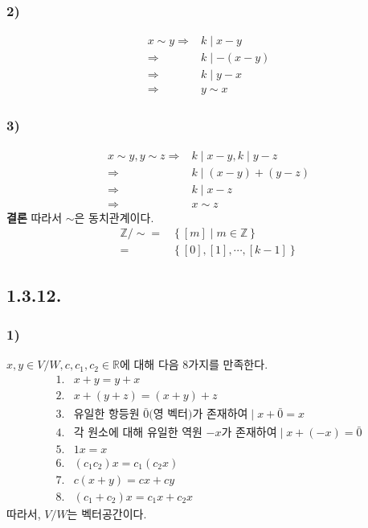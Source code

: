 \documentclass{article}
\begin{document}
\subsubsection{2)}
\begin{align*}
x \sim y \Rightarrow& k \mid x - y
\\ \Rightarrow& k \mid -(x - y)
\\ \Rightarrow& k \mid y - x
\\ \Rightarrow& y \sim x
\end{align*}

\subsubsection{3)}
\begin{align*}
x \sim y, y \sim z \Rightarrow& k \mid x - y, k \mid y - z
\\ \Rightarrow& k \mid (x - y) + (y - z)
\\ \Rightarrow& k \mid x - z
\\ \Rightarrow& x \sim z
\end{align*}
\textbf{결론} 따라서 $\sim$은 동치관계이다.
\begin{align*}
\mathbb{Z} / \sim =& \left\{\left[m \right] \mid m \in \mathbb{Z} \right\}
\\ =& \left\{\left[0 \right], \left[1 \right], \cdots, \left[k-1 \right] \right\}
\end{align*}

\subsection{1.3.12.}
\subsubsection{1)}
$x, y \in V/W, c, c_1, c_2 \in \mathbb{R}$에 대해 다음 8가지를 만족한다.
\begin{align*}
1. & x + y = y + x
\\ 2. & x + (y + z) = (x + y) + z
\\ 3. & \text{유일한 항등원 $\bar{0}$(영 벡터)가 존재하여} \mid  x + \bar{0} = x
\\ 4. & \text{각 원소에 대해 유일한 역원 $-x$가 존재하여} \mid x + (-x) = \bar{0}
\\ 5. & 1x = x
\\ 6. & (c_1 c_2)x = c_1 (c_2 x)
\\ 7. & c(x+y) = cx + cy
\\ 8. & (c_1 + c_2)x = c_1 x + c_2 x
\end{align*}
따라서, $V/W$는 벡터공간이다.
\end{document}
